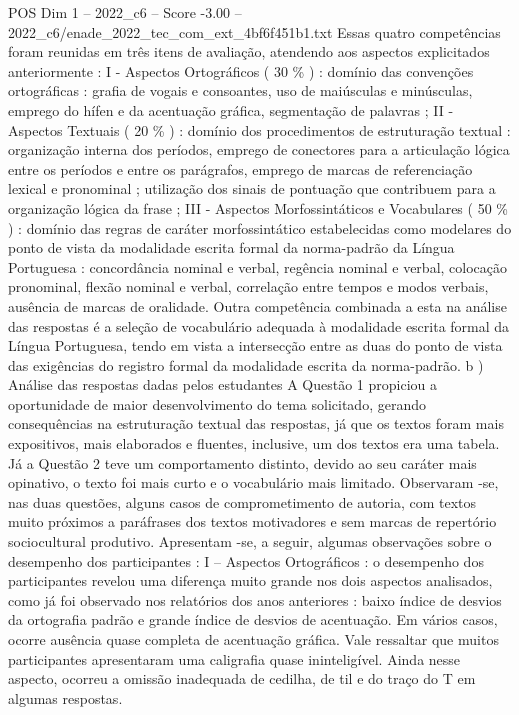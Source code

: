 \begin{textsample}{POS Dim 1 – 2022\_c6 – Score -3.00 – 2022\_c6/enade\_2022\_tec\_com\_ext\_4bf6f451b1.txt}
Essas quatro competências foram reunidas em três itens de avaliação, atendendo aos aspectos explicitados anteriormente : I - Aspectos Ortográficos ( 30 \% ) : domínio das convenções ortográficas : grafia de vogais e consoantes, uso de maiúsculas e minúsculas, emprego do hífen e da acentuação gráfica, segmentação de palavras ; II - Aspectos Textuais ( 20 \% ) : domínio dos procedimentos de estruturação textual : organização interna dos períodos, emprego de conectores para a articulação lógica entre os períodos e entre os parágrafos, emprego de marcas de referenciação lexical e pronominal ; utilização dos sinais de pontuação que contribuem para a organização lógica da frase ; III - Aspectos Morfossintáticos e Vocabulares ( 50 \% ) : domínio das regras de caráter morfossintático estabelecidas como modelares do ponto de vista da modalidade escrita formal da norma-padrão da Língua Portuguesa : concordância nominal e verbal, regência nominal e verbal, colocação pronominal, flexão nominal e verbal, correlação entre tempos e modos verbais, ausência de marcas de oralidade.
Outra competência combinada a esta na análise das respostas é a seleção de vocabulário adequada à modalidade escrita formal da Língua Portuguesa, tendo em vista a intersecção entre as duas do ponto de vista das exigências do registro formal da modalidade escrita da norma-padrão. b ) Análise das respostas dadas pelos estudantes A Questão 1 propiciou a oportunidade de maior desenvolvimento do tema solicitado, gerando consequências na estruturação textual das respostas, já que os textos foram mais expositivos, mais elaborados e fluentes, inclusive, um dos textos era uma tabela.
Já a Questão 2 teve um comportamento distinto, devido ao seu caráter mais opinativo, o texto foi mais curto e o vocabulário mais limitado.
Observaram -se, nas duas questões, alguns casos de comprometimento de autoria, com textos muito próximos a paráfrases dos textos motivadores e sem marcas de repertório sociocultural produtivo.
Apresentam -se, a seguir, algumas observações sobre o desempenho dos participantes : I – Aspectos Ortográficos : o desempenho dos participantes revelou uma diferença muito grande nos dois aspectos analisados, como já foi observado nos relatórios dos anos anteriores : baixo índice de desvios da ortografia padrão e grande índice de desvios de acentuação.
Em vários casos, ocorre ausência quase completa de acentuação gráfica.
Vale ressaltar que muitos participantes apresentaram uma caligrafia quase ininteligível.
Ainda nesse aspecto, ocorreu a omissão inadequada de cedilha, de til e do traço do T em algumas respostas.

\end{textsample}
